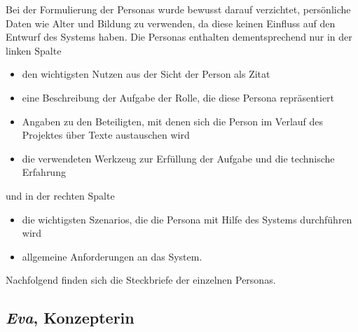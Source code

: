 Bei der Formulierung der Personas wurde bewusst darauf verzichtet, persönliche Daten wie Alter und Bildung zu verwenden, da diese keinen Einfluss auf den Entwurf des Systems haben. Die Personas enthalten dementsprechend nur in der linken Spalte
\begin{itemize}\itemsep -5pt
\item den wichtigsten Nutzen aus der Sicht der Person als Zitat
\item eine Beschreibung der Aufgabe der Rolle, die diese Persona repräsentiert
\item Angaben zu den Beteiligten, mit denen sich die Person im Verlauf des Projektes über Texte austauschen wird
\item die verwendeten Werkzeug zur Erfüllung der Aufgabe und die technische Erfahrung
\end{itemize}
und in der rechten Spalte
\begin{itemize}\itemsep -5pt
\item die wichtigsten Szenarios, die die Persona mit Hilfe des Systems durchführen wird
\item allgemeine Anforderungen an das System.
\end{itemize}

Nachfolgend finden sich die Steckbriefe der einzelnen Personas. 

\pagebreak

\subsection{\emph{Eva}, Konzepterin}\label{p:eva}

